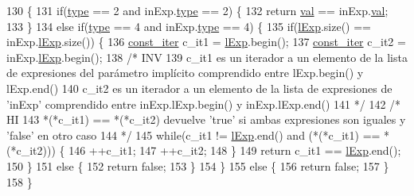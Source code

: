 \begin{DoxyCode}
130 \{
131   \textcolor{keywordflow}{if}(\hyperlink{class_expression_a2c094b93c4863b1f851ea2136aae9612}{type} == 2 and inExp.\hyperlink{class_expression_a2c094b93c4863b1f851ea2136aae9612}{type} == 2) \{
132     \textcolor{keywordflow}{return} \hyperlink{class_expression_a9c15b529b5d59e6bffb3855e384c04aa}{val} == inExp.\hyperlink{class_expression_a9c15b529b5d59e6bffb3855e384c04aa}{val};
133   \}
134   \textcolor{keywordflow}{else} \textcolor{keywordflow}{if}(\hyperlink{class_expression_a2c094b93c4863b1f851ea2136aae9612}{type} == 4 and inExp.\hyperlink{class_expression_a2c094b93c4863b1f851ea2136aae9612}{type} == 4) \{
135     \textcolor{keywordflow}{if}(\hyperlink{class_expression_afb4f4617291f7e182cbf2252151b122a}{lExp}.size() == inExp.\hyperlink{class_expression_afb4f4617291f7e182cbf2252151b122a}{lExp}.size()) \{
136       \hyperlink{_expression_8cc_a6ff59711533978050143f1bfb54c33b1}{const\_iter} c\_it1 = \hyperlink{class_expression_afb4f4617291f7e182cbf2252151b122a}{lExp}.begin();
137       \hyperlink{_expression_8cc_a6ff59711533978050143f1bfb54c33b1}{const\_iter} c\_it2 = inExp.\hyperlink{class_expression_afb4f4617291f7e182cbf2252151b122a}{lExp}.begin();
138       \textcolor{comment}{/* INV}
139 \textcolor{comment}{        c\_it1 es un iterador a un elemento de la lista de expresiones del parámetro implícito comprendido
       entre lExp.begin() y lExp.end()}
140 \textcolor{comment}{        c\_it2 es un iterador a un elemento de la lista de expresiones de 'inExp' comprendido entre
       inExp.lExp.begin() y inExp.lExp.end()}
141 \textcolor{comment}{      */}
142       \textcolor{comment}{/* HI}
143 \textcolor{comment}{        *(*c\_it1) == *(*c\_it2) devuelve 'true' si ambas expresiones son iguales y 'false' en otro caso}
144 \textcolor{comment}{      */}
145       \textcolor{keywordflow}{while}(c\_it1 != \hyperlink{class_expression_afb4f4617291f7e182cbf2252151b122a}{lExp}.end() and (*(*c\_it1) == *(*c\_it2))) \{
146         ++c\_it1;
147         ++c\_it2;
148       \}
149       \textcolor{keywordflow}{return} c\_it1 == \hyperlink{class_expression_afb4f4617291f7e182cbf2252151b122a}{lExp}.end();
150     \}
151     \textcolor{keywordflow}{else} \{
152       \textcolor{keywordflow}{return} \textcolor{keyword}{false};
153     \}
154   \}
155   \textcolor{keywordflow}{else} \{
156     \textcolor{keywordflow}{return} \textcolor{keyword}{false};
157   \}
158 \}
\end{DoxyCode}

